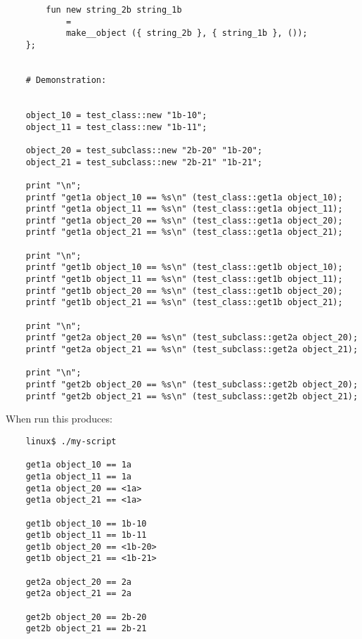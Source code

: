 \begin{verbatim}
        fun new string_2b string_1b
            =
            make__object ({ string_2b }, { string_1b }, ());
    };


    # Demonstration:


    object_10 = test_class::new "1b-10";
    object_11 = test_class::new "1b-11";

    object_20 = test_subclass::new "2b-20" "1b-20";
    object_21 = test_subclass::new "2b-21" "1b-21";

    print "\n";
    printf "get1a object_10 == %s\n" (test_class::get1a object_10);
    printf "get1a object_11 == %s\n" (test_class::get1a object_11);
    printf "get1a object_20 == %s\n" (test_class::get1a object_20);
    printf "get1a object_21 == %s\n" (test_class::get1a object_21);

    print "\n";
    printf "get1b object_10 == %s\n" (test_class::get1b object_10);
    printf "get1b object_11 == %s\n" (test_class::get1b object_11);
    printf "get1b object_20 == %s\n" (test_class::get1b object_20);
    printf "get1b object_21 == %s\n" (test_class::get1b object_21);

    print "\n";
    printf "get2a object_20 == %s\n" (test_subclass::get2a object_20);
    printf "get2a object_21 == %s\n" (test_subclass::get2a object_21);

    print "\n";
    printf "get2b object_20 == %s\n" (test_subclass::get2b object_20);
    printf "get2b object_21 == %s\n" (test_subclass::get2b object_21);
\end{verbatim}

When run this produces:

\begin{verbatim}
    linux$ ./my-script

    get1a object_10 == 1a
    get1a object_11 == 1a
    get1a object_20 == <1a>
    get1a object_21 == <1a>

    get1b object_10 == 1b-10
    get1b object_11 == 1b-11
    get1b object_20 == <1b-20>
    get1b object_21 == <1b-21>

    get2a object_20 == 2a
    get2a object_21 == 2a

    get2b object_20 == 2b-20
    get2b object_21 == 2b-21
\end{verbatim}

